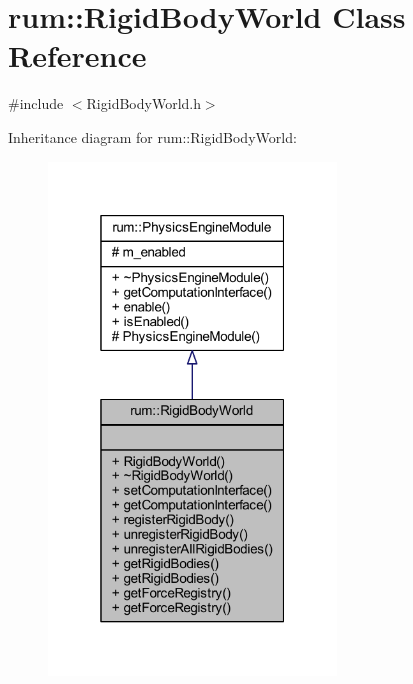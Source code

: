 \hypertarget{classrum_1_1_rigid_body_world}{}\section{rum\+:\+:Rigid\+Body\+World Class Reference}
\label{classrum_1_1_rigid_body_world}


{\ttfamily \#include $<$Rigid\+Body\+World.\+h$>$}



Inheritance diagram for rum\+:\+:Rigid\+Body\+World\+:\nopagebreak
\begin{figure}[H]
\begin{center}
\leavevmode
\includegraphics[width=217pt]{classrum_1_1_rigid_body_world__inherit__graph}
\end{center}
\end{figure}


